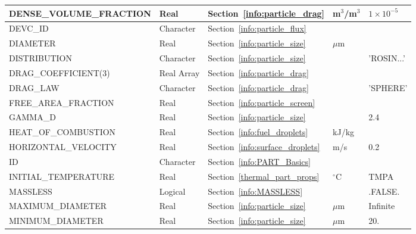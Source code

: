 \documentclass[11pt]{book}
\begin{document}
\begin{longtable}{@{\extracolsep{\fill}}|l|l|l|l|l|}
{\ct DENSE\_VOLUME\_FRACTION}       & Real            & Section~\ref{info:particle_drag}        & m$^3$/m$^3$ & $1\times 10^{-5}$ \\ \hline
{\ct DEVC\_ID}                      & Character       & Section~\ref{info:particle_flux}        &           &               \\ \hline
{\ct DIAMETER}                      & Real            & Section~\ref{info:particle_size}        & $\mu$m    &               \\ \hline
{\ct DISTRIBUTION}                  & Character       & Section~\ref{info:particle_size}        &           & {\ct 'ROSIN...'} \\ \hline
{\ct DRAG\_COEFFICIENT(3)}          & Real Array      & Section~\ref{info:particle_drag}        &           &               \\ \hline
{\ct DRAG\_LAW}                     & Character       & Section~\ref{info:particle_drag}        &           & {\ct 'SPHERE'}\\ \hline
{\ct FREE\_AREA\_FRACTION}          & Real            & Section~\ref{info:particle_screen}               &           &               \\ \hline
{\ct GAMMA\_D}                      & Real            & Section~\ref{info:particle_size}        &           & 2.4           \\ \hline
{\ct HEAT\_OF\_COMBUSTION}          & Real            & Section~\ref{info:fuel_droplets}        & kJ/kg     &               \\ \hline
{\ct HORIZONTAL\_VELOCITY}          & Real            & Section~\ref{info:surface_droplets}     & m/s       &  0.2          \\ \hline
{\ct ID}                            & Character       & Section~\ref{info:PART_Basics}          &           &               \\ \hline
{\ct INITIAL\_TEMPERATURE}          & Real            & Section~\ref{thermal_part_props}        & $^\circ$C & {\ct TMPA}    \\ \hline
{\ct MASSLESS}                      & Logical         & Section~\ref{info:MASSLESS}             &           & {\ct .FALSE.} \\ \hline
{\ct MAXIMUM\_DIAMETER}             & Real            & Section~\ref{info:particle_size}        & $\mu$m    & Infinite      \\ \hline
{\ct MINIMUM\_DIAMETER}             & Real            & Section~\ref{info:particle_size}        & $\mu$m    & 20.           \\ \hline

\end{longtable}
\end{document}
